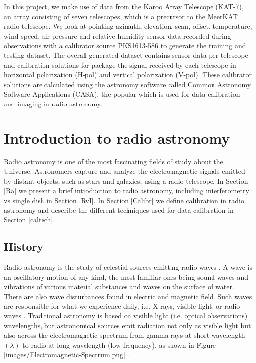 In this project, we make use of data from the Karoo Array Telescope (KAT-7), an array consisting of seven telescopes, which is a precursor to the MeerKAT radio telescope. We look at pointing azimuth, elevation, scan, offset, temperature, wind speed, air pressure and relative humidity sensor data recorded during observations with a calibrator source PKS1613-586 to generate the training and testing dataset. The overall generated dataset contains sensor data per telescope and calibration solutions for package the signal received by each telescope in horizontal polarization (H-pol)  and vertical polarization (V-pol). These calibrator solutions are calculated using the astronomy software called Common Astronomy Software Applications (CASA), the popular which is used for data calibration and imaging in radio astronomy.
 
\section{Introduction to radio astronomy}

Radio astronomy is one of the most fascinating fields of study about the Universe. Astronomers capture and analyze the electromagnetic signals emitted by distant objects, such as stars and galaxies, using a radio telescope. In Section \ref{Ra} we present a brief introduction to radio astronomy, including interferometry vs single dish in Section \ref{RvI}. In Section \ref{Calibr} we define calibration in radio astronomy and describe the different techniques used for data calibration in Section \ref{caltech}.
\label{Ra}
\subsection{History}


Radio astronomy is the study of celestial sources emitting radio waves \citep{verschuur2015invisible}. A wave is an oscillatory motion of any kind, the most familiar ones being sound waves and vibrations of various material substances and waves on the surface of water. There are also wave  disturbances found in electric and magnetic field. Such waves are responsible for what we experience daily, i.e. X-rays, visible light, or radio waves \citep{cassidy2002wave}. Traditional astronomy is based on visible light (i.e. optical observations) wavelengths, but astronomical sources emit radiation not only as visible light but
also across the electromagnetic spectrum from gamma rays at short wavelength$(\lambda)$ to radio at long wavelength (low frequency), as shown in Figure \ref{images/Electromagnetic-Spectrum.png} \citep{staats2016genetic}.

